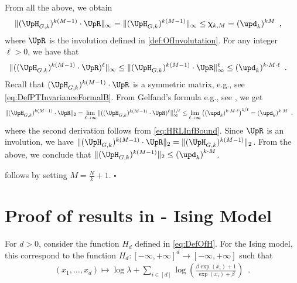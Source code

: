 \documentclass[11pt,reqno]{amsart}
\numberwithin{equation}{section}
\newcommand{\applegreen}[1]{ {\color{applegreen}#1}}
\newcommand{\bluepigment}[1]{{\color{blue(pigment)}#1}}
\newcommand{\capri}[1]{{\color{capri}#1}}
\newcommand{\cadmiumgreen}[1]{{\color{cadmiumgreen}#1}}
\newcommand{\cadmiumorange}[1]{{\color{cadmiumorange}#1}}
\newcommand{\goldenbrown}[1]{{\color{goldenbrown}#1}}
\newcommand{\heliotrope}[1]{{\color{heliotrope}#1}}
\newcommand{\cconnective}{\goldenbrown{\upd}}
\newcommand{\logtrecur}{H}
\newcommand{\norm}[2]{\goldenbrown{\|} #1 \goldenbrown{\|}_{#2}}
\newcommand{\nnorm}[3]{\goldenbrown{\|} #1\goldenbrown{\|}^{#2}_{#3}}
\newcommand{\NBMatrix}{\cadmiumgreen{\UpH}_{G,\kk}}
\newcommand{\Invol}{\UpR}
\newcommand{\spreadpoint}{\newpage}
\renewcommand{\spreadpoint}{}
\renewcommand{\applegreen}[1]{#1}
\renewcommand{\bluepigment}[1]{#1}
\renewcommand{\capri}[1]{#1}
\renewcommand{\cadmiumgreen}[1]{#1}
\renewcommand{\cadmiumorange}[1]{#1}
\renewcommand{\goldenbrown}[1]{#1}
\renewcommand{\heliotrope}[1]{#1}
\newcommand{\ki}{\capri{i}}
\newcommand{\kk}{\bluepigment{k}}
\newcommand{\kell}{{\color{green(pigment)}\ell}}%
\newcommand{\kM}{\cadmiumorange{M}}
\newcommand{\kx}{\heliotrope{x}}
\renewcommand{\ki}{i}
\renewcommand{\kk}{k}
\renewcommand{\kell}{\ell}
\renewcommand{\kM}{M}
\renewcommand{\kx}{x}
\begin{document}
From all the above, we obtain 
\begin{align}\nonumber
\norm{ (\NBMatrix)^{\kk(\kM-1)}\cdot \Invol }{\infty}=
\norm{ (\NBMatrix)^{\kk(\kM-1)}}{\infty} &\leq \upchi_{\kk,\kM}= (\cconnective_{\kk})^{\kk \kM}\enspace, 
\end{align}
where $\Invol$ is the involution defined in \eqref{def:OfInvolutation}.
%
For any integer $\kell>0$, we have that
\begin{align}\label{eq:HRLInfBound}
\norm{ ( (\NBMatrix)^{\kk(\kM-1)}\cdot \Invol )^{\kell}}{\infty} &\leq 
\nnorm{
(\NBMatrix)^{\kk(\kM-1)}\cdot \Invol}{\kell}{\infty} \leq (\cconnective_{\kk})^{\kk\cdot \kM\cdot \kell}
%
\enspace. 
\end{align}
Recall that $(\NBMatrix)^{\kk(\kM-1)}\cdot \Invol$ is a symmetric matrix, e.g., see \eqref{eq:DefPTInvarianceFormalB}. 
%
From  Gelfand's formula e.g., see \cite{SIAM-LAlg}, we get
% 
\begin{align}\nonumber
\norm{ (\NBMatrix)^{\kk(\kM-1)}\cdot \Invol }{2} =
 \lim_{\kell\to\infty} 
  \nnorm{  {\textstyle ( (\NBMatrix)^{\kk(\kM-1)}\cdot \Invol )^{\kell} } }{1/\kell}{\infty} &
 \leq \lim_{\kell \to \infty} \left ((\cconnective_{\kk})^{\kk\cdot M\cdot \kell} \right)^{1/\kell}
= (\cconnective_{\kk})^{\kk\cdot \kM} \enspace. 
\end{align}
where the second derivation follows from \eqref{eq:HRLInfBound}. 
%
Since $\Invol$ is an involution, we have  $\norm{ (\NBMatrix)^{\kk(\kM-1)}\cdot \Invol}{2}=\norm{ (\NBMatrix)^{\kk(\kM-1)}}{2}$. 
From the above,  we conclude that $\norm{ (\NBMatrix)^{\kk(\kM-1)}}{2} \leq \left(\cconnective_{\kk}\right)^{\kk\cdot \kM}$.

 follows by setting $\kM=\frac{N}{k}+1$. 
%
\hfill $\square$







\spreadpoint
 \section{Proof of results in  - Ising Model}\label{sec:MainResultsIsing}
For $d>0$, consider the function $\logtrecur_d$ defined in \eqref{eq:DefOfH}.
For the Ising model, this correspond to the  function  $\logtrecur_d:[-\infty, +\infty]^d\to [-\infty, +\infty] $ such that
%
%
{\small
\begin{align}\label{eq:LogRatioIsing}
 (\kx_1, \ldots, \kx_d)\mapsto \log\lambda+ \sum\nolimits_{\ki\in [d]}
\log\left( \frac{\beta \exp(\kx_{\ki})+1}{\exp(\kx_{\ki})+\beta} \right) \enspace .
\end{align}
}
\end{document}
